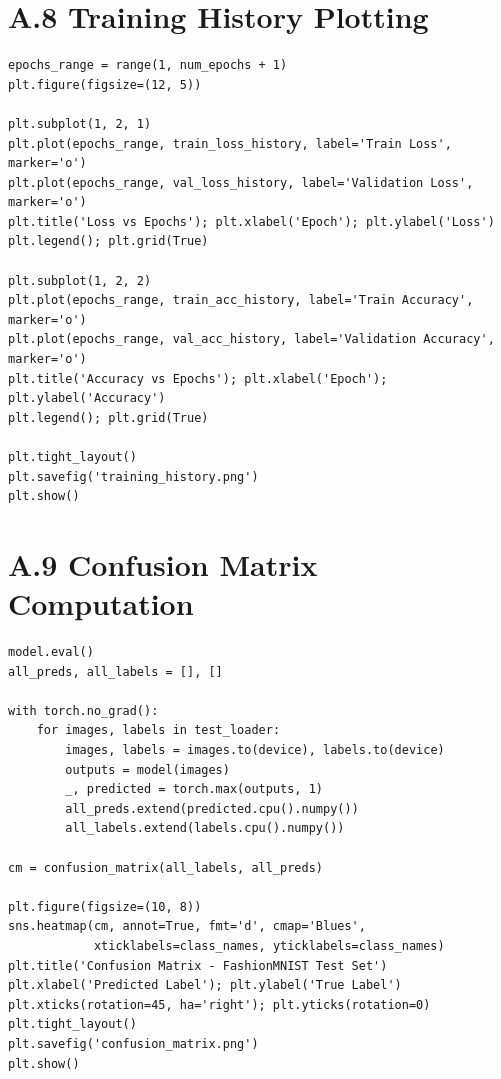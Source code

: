 \documentclass[12pt,a4paper]{report}
\begin{document}
\section*{A.8 Training History Plotting}
\begin{lstlisting}
epochs_range = range(1, num_epochs + 1)
plt.figure(figsize=(12, 5))

plt.subplot(1, 2, 1)
plt.plot(epochs_range, train_loss_history, label='Train Loss', marker='o')
plt.plot(epochs_range, val_loss_history, label='Validation Loss', marker='o')
plt.title('Loss vs Epochs'); plt.xlabel('Epoch'); plt.ylabel('Loss')
plt.legend(); plt.grid(True)

plt.subplot(1, 2, 2)
plt.plot(epochs_range, train_acc_history, label='Train Accuracy', marker='o')
plt.plot(epochs_range, val_acc_history, label='Validation Accuracy', marker='o')
plt.title('Accuracy vs Epochs'); plt.xlabel('Epoch'); plt.ylabel('Accuracy')
plt.legend(); plt.grid(True)

plt.tight_layout()
plt.savefig('training_history.png')
plt.show()
\end{lstlisting}

\section*{A.9 Confusion Matrix Computation}
\begin{lstlisting}
model.eval()
all_preds, all_labels = [], []

with torch.no_grad():
    for images, labels in test_loader:
        images, labels = images.to(device), labels.to(device)
        outputs = model(images)
        _, predicted = torch.max(outputs, 1)
        all_preds.extend(predicted.cpu().numpy())
        all_labels.extend(labels.cpu().numpy())

cm = confusion_matrix(all_labels, all_preds)

plt.figure(figsize=(10, 8))
sns.heatmap(cm, annot=True, fmt='d', cmap='Blues',
            xticklabels=class_names, yticklabels=class_names)
plt.title('Confusion Matrix - FashionMNIST Test Set')
plt.xlabel('Predicted Label'); plt.ylabel('True Label')
plt.xticks(rotation=45, ha='right'); plt.yticks(rotation=0)
plt.tight_layout()
plt.savefig('confusion_matrix.png')
plt.show()
\end{lstlisting}
\end{document}
